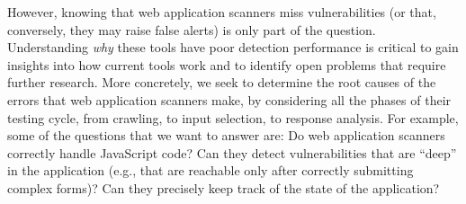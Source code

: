 However, knowing that web application scanners miss vulnerabilities (or
that, conversely, they may raise false alerts) is only part of the
question. Understanding {\em why} these tools have poor detection
performance is critical to gain insights into how current tools work and
to identify open problems that require further research.  
%
More concretely, we seek to determine the root causes of the
errors that web application scanners make, by considering all the phases
of their testing cycle, from crawling, to input selection, to response
analysis.
%
For example, some of the questions that we want to
answer are: Do web application scanners correctly handle JavaScript
code? Can they detect vulnerabilities that are ``deep'' in the
application (e.g., that are reachable only after correctly submitting
complex forms)? Can they precisely keep track of the state of the
application?



